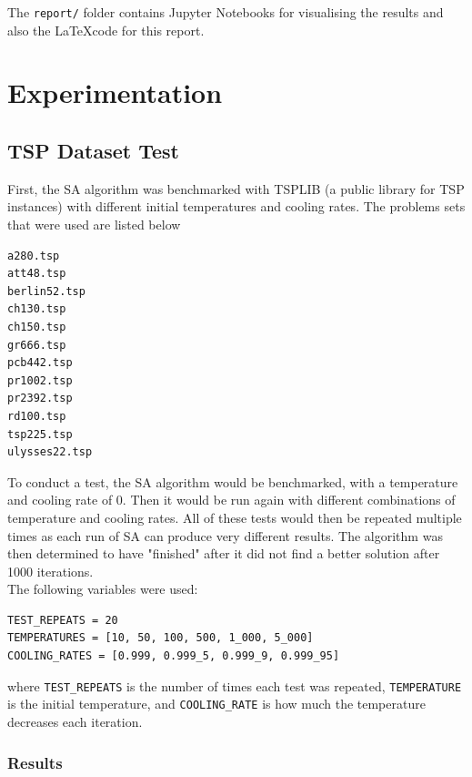 \documentclass{article}
\begin{document}
The \texttt{report/} folder contains Jupyter Notebooks for visualising the results and also the \LaTeX code for this report.

\newpage
\section{Experimentation}

\subsection{TSP Dataset Test}
First, the SA algorithm was benchmarked with TSPLIB \cite{tsplib} (a public library for TSP instances) with different initial temperatures and cooling rates.
The problems sets that were used are listed below

\begin{multicols}{6}
\begin{verbatim}
a280.tsp
att48.tsp
berlin52.tsp
ch130.tsp
ch150.tsp
gr666.tsp
pcb442.tsp
pr1002.tsp
pr2392.tsp
rd100.tsp
tsp225.tsp
ulysses22.tsp
\end{verbatim}
\end{multicols}

To conduct a test, the SA algorithm would be benchmarked, with a temperature and cooling rate of 0.
Then it would be run again with different combinations of temperature and cooling rates.
All of these tests would then be repeated multiple times as each run of SA can produce very different results.
The algorithm was then determined to have "finished" after it did not find a better solution after 1000 iterations.
\\

The following variables were used:

\begin{verbatim}
TEST_REPEATS = 20
TEMPERATURES = [10, 50, 100, 500, 1_000, 5_000]
COOLING_RATES = [0.999, 0.999_5, 0.999_9, 0.999_95]
\end{verbatim}

where \texttt{TEST\_REPEATS} is the number of times each test was repeated, \texttt{TEMPERATURE} is the initial temperature, and \texttt{COOLING\_RATE} is how much the temperature decreases each iteration.

\subsubsection{Results}
\end{document}

